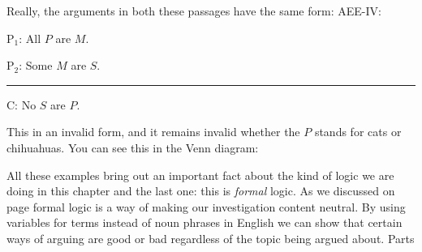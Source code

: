{Really, the arguments in both these passages have the same form: AEE-IV: 

\begin{earg}
\item[P$_1$:] All $P$ are $M$.
\item[P$_2$:] Some $M$ are $S$.
\vspace{-.5em}
\item [] \rule{0.2\linewidth}{.5pt} 
\item[C:] No $S$ are $P$.
\end{earg} 

This in an invalid form, and it remains invalid whether the $P$ stands for cats or chihuahuas. You can see this in the Venn diagram:

\begin{center}
\end{center}

All these examples bring out an important fact about the kind of logic we are doing in this chapter and the last one: this is \emph{formal} logic. As we discussed on page \pageref{def:Formal_logic} formal logic is a way of making our investigation content neutral. By using variables for terms instead of noun phrases in English we can show that certain ways of arguing are good or bad regardless of the topic being argued about.  
{Parts  
{}}


}
